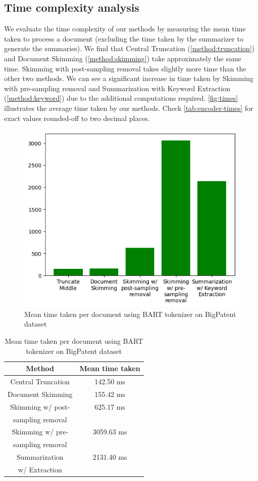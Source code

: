 	\subsection*{Time complexity analysis}

		We evaluate the time complexity of our methods by measuring the mean time taken to process
		a document (excluding the time taken by the summarizer to generate the summaries).
		We find that Central Truncation (\ref{method:truncation}) and Document Skimming
		(\ref{method:skimming}) take approximately the same time.
		Skimming with post-sampling removal takes slightly more time than the other two methods.
		We can see a significant increase in time taken by Skimming with pre-sampling removal
		and Summarization with Keyword Extraction (\ref{method:keyword}) due to the additional
		computations required.
		\autoref{fig:times} illustrates the average time taken by our methods.
		Check \autoref{tab:encoder-times} for exact values rounded-off to two decimal places.

		\begin{figure}[!ht]
			\centering
			\includegraphics[width=.48\textwidth]{Images/encoder-times.png}
			\caption{Mean time taken per document using BART tokenizer on BigPatent dataset}
			\label{fig:times}
		\end{figure}

		\begin{table}[!ht]
			\centering

			\begin{tabular}{c c}
				\hline
				Method & Mean time taken \\
				\hline
				Central Truncation & 142.50 ms \\
				Document Skimming & 155.42 ms \\
				Skimming w/ post- & 625.17 ms \\
				sampling removal & \\
				Skimming w/ pre- & 3059.63 ms \\
				sampling removal & \\
				Summarization & 2131.40 ms \\
				w/ Extraction & \\
				\hline
			\end{tabular}

			\caption{Mean time taken per document using BART tokenizer on BigPatent dataset}
			\label{tab:encoder-times}
		\end{table}
